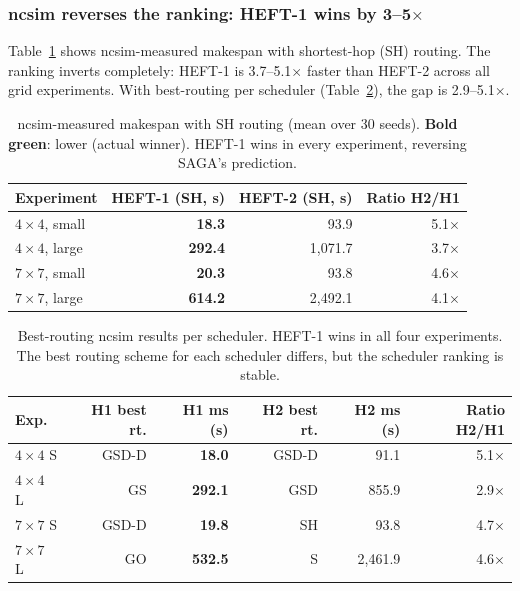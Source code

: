 \documentclass[11pt]{article}
\newcommand{\win}[1]{\textcolor{green!50!black}{\textbf{#1}}}
\begin{document}
\subsubsection{ncsim reverses the ranking: HEFT-1 wins by 3--5$\times$}

Table~\ref{tab:ncsim-sh} shows ncsim-measured makespan with shortest-hop (SH)
routing.  The ranking inverts completely: HEFT-1 is 3.7--5.1$\times$ faster
than HEFT-2 across all grid experiments.  With best-routing per scheduler
(Table~\ref{tab:ncsim-best}), the gap is 2.9--5.1$\times$.

\begin{table}[H]
\centering
\small
\begin{tabular}{l r r r}
\toprule
\textbf{Experiment} & \textbf{HEFT-1 (SH, s)} & \textbf{HEFT-2 (SH, s)} & \textbf{Ratio H2/H1} \\
\midrule
$4\times4$, small & \win{18.3}   & 93.9         & 5.1$\times$ \\
$4\times4$, large & \win{292.4}  & 1{,}071.7    & 3.7$\times$ \\
$7\times7$, small & \win{20.3}   & 93.8         & 4.6$\times$ \\
$7\times7$, large & \win{614.2}  & 2{,}492.1    & 4.1$\times$ \\
\bottomrule
\end{tabular}
\caption{ncsim-measured makespan with SH routing (mean over 30 seeds).
\win{Bold green}: lower (actual winner).
HEFT-1 wins in every experiment, reversing SAGA's prediction.}
\label{tab:ncsim-sh}
\end{table}

\begin{table}[H]
\centering
\small
\begin{tabular}{l r r r r r}
\toprule
\textbf{Exp.}
  & \textbf{H1 best rt.} & \textbf{H1 ms (s)}
  & \textbf{H2 best rt.} & \textbf{H2 ms (s)}
  & \textbf{Ratio H2/H1} \\
\midrule
$4\times4$ S & GSD-D & \win{18.0}   & GSD-D & 91.1  & 5.1$\times$ \\
$4\times4$ L & GS    & \win{292.1}  & GSD   & 855.9 & 2.9$\times$ \\
$7\times7$ S & GSD-D & \win{19.8}   & SH    & 93.8  & 4.7$\times$ \\
$7\times7$ L & GO    & \win{532.5}  & S     & 2{,}461.9 & 4.6$\times$ \\
\bottomrule
\end{tabular}
\caption{Best-routing ncsim results per scheduler.  HEFT-1 wins in all four
experiments.  The best routing scheme for each scheduler differs, but the
scheduler ranking is stable.}
\label{tab:ncsim-best}
\end{table}
\end{document}
